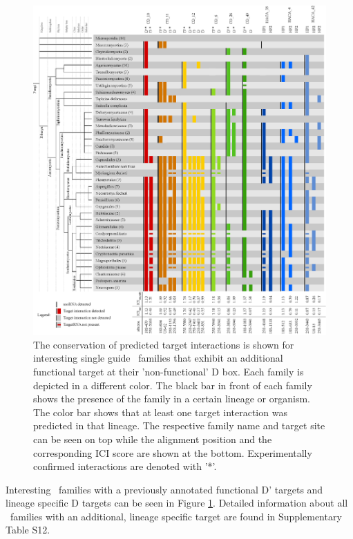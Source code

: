 \begin{figure}
  \centering
  \includegraphics[width=\textwidth]{pics/conservation_lineage_specific_targets.eps}
  \caption{The conservation of predicted target interactions is shown
    for interesting single guide \cd\ families that exhibit an
    additional functional target at their 'non-functional' D box. Each
    family is depicted in a different color. The black bar in front of
    each family shows the presence of the family in a certain lineage
    or organism. The color bar shows that at least one target
    interaction was predicted in that lineage. The respective family
    name and target site can be seen on top while the alignment
    position and the corresponding ICI score are shown at the
    bottom. Experimentally confirmed interactions are denoted with
    '*'.}
  \label{fig:additional_targets}
\end{figure}

Interesting \cd\ families with a previously annotated functional D'
targets and lineage specific D targets can be seen in Figure
\ref{fig:additional_targets}. Detailed information about all \sno\
families with an additional, lineage specific target are found in
Supplementary Table S12.

